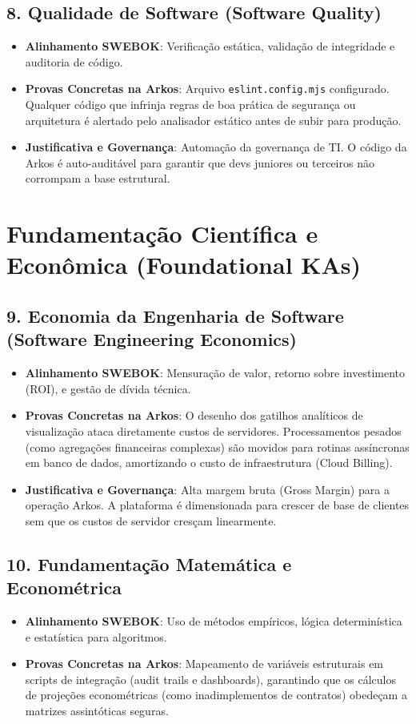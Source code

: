 \subsection{8. Qualidade de Software (Software Quality)}
\begin{itemize}
    \item \textbf{Alinhamento SWEBOK}: Verificação estática, validação de integridade e auditoria de código.
    \item \textbf{Provas Concretas na Arkos}: Arquivo \texttt{eslint.config.mjs} configurado. Qualquer código que infrinja regras de boa prática de segurança ou arquitetura é alertado pelo analisador estático antes de subir para produção.
    \item \textbf{Justificativa e Governança}: Automação da governança de TI. O código da Arkos é auto-auditável para garantir que devs juniores ou terceiros não corrompam a base estrutural.
\end{itemize}

\pagebreak

\section{Fundamentação Científica e Econômica (Foundational KAs)}

\subsection{9. Economia da Engenharia de Software (Software Engineering Economics)}
\begin{itemize}
    \item \textbf{Alinhamento SWEBOK}: Mensuração de valor, retorno sobre investimento (ROI), e gestão de dívida técnica.
    \item \textbf{Provas Concretas na Arkos}: O desenho dos gatilhos analíticos de visualização ataca diretamente custos de servidores. Processamentos pesados (como agregações financeiras complexas) são movidos para rotinas assíncronas em banco de dados, amortizando o custo de infraestrutura (Cloud Billing).
    \item \textbf{Justificativa e Governança}: Alta margem bruta (Gross Margin) para a operação Arkos. A plataforma é dimensionada para crescer de base de clientes sem que os custos de servidor cresçam linearmente.
\end{itemize}

\subsection{10. Fundamentação Matemática e Econométrica}
\begin{itemize}
    \item \textbf{Alinhamento SWEBOK}: Uso de métodos empíricos, lógica determinística e estatística para algoritmos.
    \item \textbf{Provas Concretas na Arkos}: Mapeamento de variáveis estruturais em scripts de integração (audit trails e dashboards), garantindo que os cálculos de projeções econométricas (como inadimplementos de contratos) obedeçam a matrizes assintóticas seguras.
\end{itemize}

